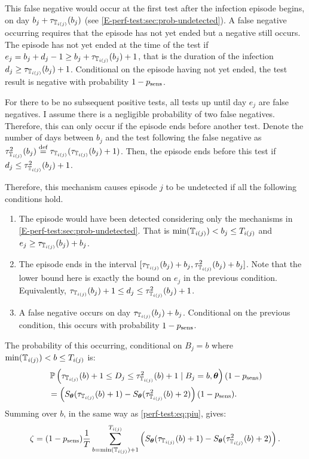 \documentclass[thesis.tex]{subfiles}
\begin{document}
This false negative would occur at the first test after the infection episode begins, on day $b_j + \tau_{\mathbb{T}_{i(j)}}(b_j)$ (see \cref{E-perf-test:sec:prob-undetected}).
A false negative occurring requires that the episode has not yet ended but a negative still occurs.
The episode has not yet ended at the time of the test if $e_j = b_j + d_j - 1 \geq b_j + \tau_{\mathbb{T}_{i(j)}}(b_j) + 1$, that is the duration of the infection $d_j \geq \tau_{\mathbb{T}_{i(j)}}(b_j) + 1$.
Conditional on the episode having not yet ended, the test result is negative with probability $1 - p_\text{sens}$.

For there to be no subsequent positive tests, all tests up until day $e_j$ are false negatives.
I assume there is a negligible probability of two false negatives.
Therefore, this can only occur if the episode ends before another test.
Denote the number of days between $b_j$ and the test following the false negative as $\tau^2_{\mathbb{T}_{i(j)}}(b_j) \stackrel{\text{def}}{=} \tau_{\mathbb{T}_{i(j)}}(\tau_{\mathbb{T}_{i(j)}}(b_j) + 1)$.
Then, the episode ends before this test if $d_j \leq \tau^2_{\mathbb{T}_{i(j)}}(b_j) + 1$.

Therefore, this mechanism causes episode $j$ to be undetected if all the following conditions hold.
\begin{enumerate}
    \item The episode would have been detected considering only the mechanisms in \cref{E-perf-test:sec:prob-undetected}. That is $\min(\mathbb{T}_{i(j)}) < b_j \leq T_{i(j)}$ and $e_j \geq \tau_{\mathbb{T}_{i(j)}}(b_j) + b_j$.
    \item The episode ends in the interval $[\tau_{\mathbb{T}_{i(j)}}(b_j) + b_j, \tau^2_{\mathbb{T}_{i(j)}}(b_j) + b_j]$.
      Note that the lower bound here is exactly the bound on $e_j$ in the previous condition.
      Equivalently, $\tau_{\mathbb{T}_{i(j)}}(b_j) + 1 \leq d_j \leq \tau^2_{\mathbb{T}_{i(j)}}(b_j) + 1$.
    \item A false negative occurs on day $\tau_{\mathbb{T}_{i(j)}}(b_j) + b_j$. Conditional on the previous condition, this occurs with probability $1 - p_\text{sens}$.
\end{enumerate}

The probability of this occurring, conditional on $B_j = b$ where $\min(\mathbb{T}_{i(j)}) < b \leq T_{i(j)}$ is:
\begin{align}
&\operatorname{\mathbb{P}} \left(
    \tau_{\mathbb{T}_{i(j)}}(b) + 1 \leq D_j \leq \tau^2_{\mathbb{T}_{i(j)}}(b) + 1
    \mid B_j = b, \bm{\theta} \right) (1 - p_\text{sens}) \\
&= \left( S_{\bm{\theta}}(\tau_{\mathbb{T}_{i(j)}}(b) + 1) - S_{\bm{\theta}}(\tau^2_{\mathbb{T}_{i(j)}}(b) + 2) \right) (1 - p_\text{sens}).
\end{align}
Summing over $b$, in the same way as \cref{perf-test:eq:piu}, gives:
\begin{align}
\zeta = (1 - p_\text{sens})\frac{1}{T} \sum_{b=\min(\mathbb{T}_{i(j)}) + 1}^{T_{i(j)}} \left( S_{\bm{\theta}}(\tau_{\mathbb{T}_{i(j)}}(b) + 1) - S_{\bm{\theta}}(\tau^2_{\mathbb{T}_{i(j)}}(b) + 2) \right).
\label{imperf-test:eq:zeta}
\end{align}
\end{document}
